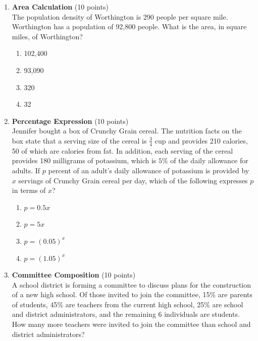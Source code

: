 \begin{enumerate}
  \newpage

  \item \textbf{Area Calculation} (10 points)\\
  The population density of Worthington is 290 people per square mile. Worthington has a population of 92,800 people. What is the area, in square miles, of Worthington?
  \begin{enumerate}[label=(\Alph*)]
    \item 102,400
    \item 93,090
    \item 320
    \item 32
  \end{enumerate}
  \begin{subanswer}
  \end{subanswer}

  \item \textbf{Percentage Expression} (10 points)\\
  Jennifer bought a box of Crunchy Grain cereal. The nutrition facts on the box state that a serving size of the cereal is $\frac{3}{4}$ cup and provides 210 calories, 50 of which are calories from fat. In addition, each serving of the cereal provides 180 milligrams of potassium, which is $5\%$ of the daily allowance for adults. If $p$ percent of an adult's daily allowance of potassium is provided by $x$ servings of Crunchy Grain cereal per day, which of the following expresses $p$ in terms of $x$?
  \begin{enumerate}[label=(\Alph*)]
    \item $p=0.5 x$
    \item $p=5 x$
    \item $p=(0.05)^{x}$
    \item $p=(1.05)^{x}$
  \end{enumerate}
  \begin{subanswer}
  \end{subanswer}

  \item \textbf{Committee Composition} (10 points)\\
  A school district is forming a committee to discuss plans for the construction of a new high school. Of those invited to join the committee, 15\% are parents of students, 45\% are teachers from the current high school, 25\% are school and district administrators, and the remaining 6 individuals are students. How many more teachers were invited to join the committee than school and district administrators?
  \begin{subanswer}
  \end{subanswer}


\end{enumerate}
